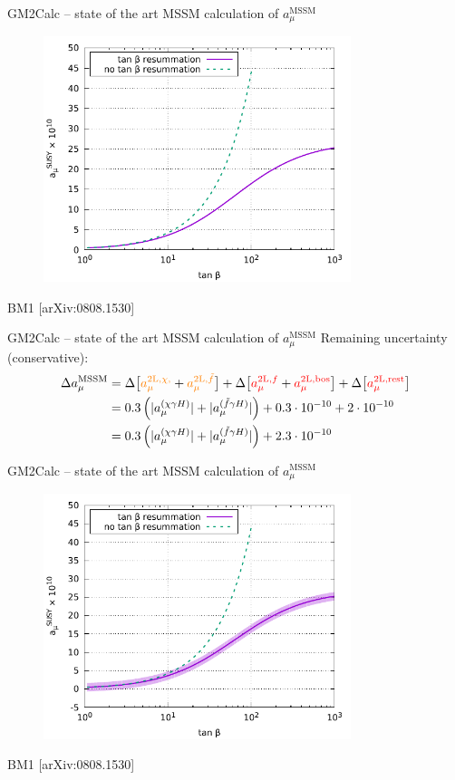 \documentclass[hyperref={pdfpagelabels=false},ngerman]{beamer}
\newcommand{\MSSM}{\ensuremath{\text{MSSM}}}
\newcommand{\amu}{a_\mu}
\newcommand{\amuMSSM}{\amu^{\MSSM}}
\newcommand{\amuMSSMTwoLBZC}{\amu^{\text{2L},\chi,}}
\newcommand{\amuMSSMTwoLBZf}{\amu^{\text{2L},\tilde{f}}}
\newcommand{\amuMSSMTwoLHf}{\amu^{\text{2L},f}}
\newcommand{\amuMSSMTwoLHV}{\amu^{\text{2L},\text{bos}}}
\newcommand{\amuMSSMTwoLrest}{\amu^{\text{2L,rest}}}
\begin{document}
\begin{frame}{GM2Calc -- state of the art MSSM calculation of $\amuMSSM$}
  \begin{figure}
    \centering
    \includegraphics[width=0.8\textwidth]{plots/tb_resummation}
  \end{figure}
  BM1 [arXiv:0808.1530]
\end{frame}

\begin{frame}{GM2Calc -- state of the art MSSM calculation of $\amuMSSM$}
  Remaining uncertainty (conservative):
  \begin{align*}
    \Delta \amuMSSM &=
    \Delta\big[\textcolor{orange}{\amuMSSMTwoLBZC} + \textcolor{orange}{\amuMSSMTwoLBZf}\big]
    +\Delta\big[\textcolor{red}{\amuMSSMTwoLHf} + \textcolor{red}{\amuMSSMTwoLHV}\big]
    +\Delta\big[\textcolor{red}{\amuMSSMTwoLrest}\big]\\
    &= 0.3 \left( |a_\mu^{(\chi\gamma H)}| + |a_\mu^{(\tilde{f}\gamma H)}| \right)
    + 0.3 \cdot 10^{-10} + 2 \cdot 10^{-10}\\
    &= 0.3 \left( |a_\mu^{(\chi\gamma H)}| + |a_\mu^{(\tilde{f}\gamma H)}| \right)
    + 2.3\cdot 10^{-10}
  \end{align*}
\end{frame}

\begin{frame}{GM2Calc -- state of the art MSSM calculation of $\amuMSSM$}
  \begin{figure}
    \centering
    \includegraphics[width=0.8\textwidth]{plots/tb_resummation_uncertainty}
  \end{figure}
  BM1 [arXiv:0808.1530]
\end{frame}
\end{document}
